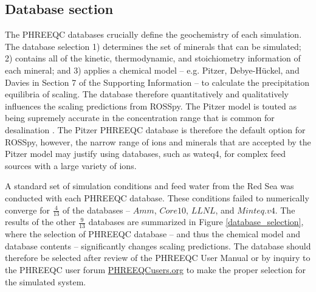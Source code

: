 \subsection{Database section}
The PHREEQC databases crucially define the geochemistry of each simulation. The database selection 1) determines the set of minerals that can be simulated; 2) contains all of the kinetic, thermodynamic, and stoichiometry information of each mineral; and 3) applies a chemical model -- e.g. Pitzer, Debye-H\"uckel, and Davies in Section 7 of the Supporting Information -- to calculate the precipitation equilibria of scaling. The database therefore quantitatively and qualitatively influences the scaling predictions from ROSSpy. The Pitzer model \cite{Pitzer1973ThermodynamicsEquations,Pitzer1974ThermodynamicsElectrolytes} is touted as being supremely accurate in the concentration range that is common for desalination \cite{VandeLisdonk2001PredictionSystems,Sheikholeslami2004AssessmentUnits,Mohammad2007PredictionMembranes}. The Pitzer PHREEQC database is therefore the default option for ROSSpy, however, the narrow range of ions and minerals that are accepted by the Pitzer model may justify using databases, such as wateq4, for complex feed sources with a large variety of ions.

A standard set of simulation conditions and feed water from the Red Sea was conducted with each PHREEQC database. These conditions failed to numerically converge for $\frac{4}{13}$ of the databases -- $Amm$, $Core10$, $LLNL$, and $Minteq.v4$. The results of the other $\frac{9}{13}$ databases are summarized in Figure \ref{database_selection}, where the selection of PHREEQC database -- and thus the chemical model and database contents -- significantly changes scaling predictions. The database should therefore be selected after review of the PHREEQC User Manual or by inquiry to the PHREEQC user forum \url{PHREEQCusers.org} to make the proper selection for the simulated system.

